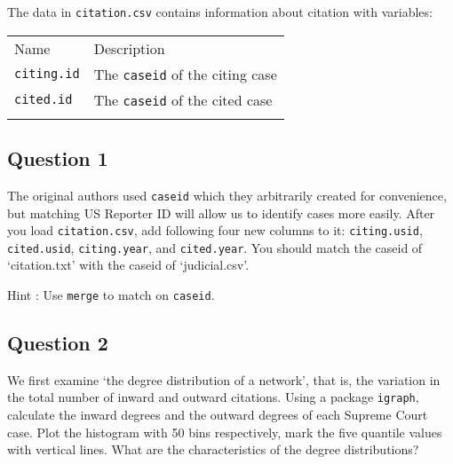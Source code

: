 \documentclass[]{article}
\begin{document}
The data in \texttt{citation.csv} contains information about citation
with variables:

\begin{longtable}[c]{@{}ll@{}}
\toprule\addlinespace
\begin{minipage}[b]{0.25\columnwidth}\raggedright
Name
\end{minipage} & \begin{minipage}[b]{0.68\columnwidth}\raggedright
Description
\end{minipage}
\\\addlinespace
\midrule\endhead
\begin{minipage}[t]{0.25\columnwidth}\raggedright
\texttt{citing.id}
\end{minipage} & \begin{minipage}[t]{0.68\columnwidth}\raggedright
The \texttt{caseid} of the citing case
\end{minipage}
\\\addlinespace
\begin{minipage}[t]{0.25\columnwidth}\raggedright
\texttt{cited.id}
\end{minipage} & \begin{minipage}[t]{0.68\columnwidth}\raggedright
The \texttt{caseid} of the cited case
\end{minipage}
\\\addlinespace
\bottomrule
\end{longtable}

\subsection{Question 1}\label{question-1}

The original authors used \texttt{caseid} which they arbitrarily created
for convenience, but matching US Reporter ID will allow us to identify
cases more easily. After you load \texttt{citation.csv}, add following
four new columns to it: \texttt{citing.usid}, \texttt{cited.usid},
\texttt{citing.year}, and \texttt{cited.year}. You should match the
caseid of `citation.txt' with the caseid of `judicial.csv'.

Hint : Use \texttt{merge} to match on \texttt{caseid}.

\subsection{Question 2}\label{question-2}

We first examine `the degree distribution of a network', that is, the
variation in the total number of inward and outward citations. Using a
package \texttt{igraph}, calculate the inward degrees and the outward
degrees of each Supreme Court case. Plot the histogram with 50 bins
respectively, mark the five quantile values with vertical lines. What
are the characteristics of the degree distributions?
\end{document}
